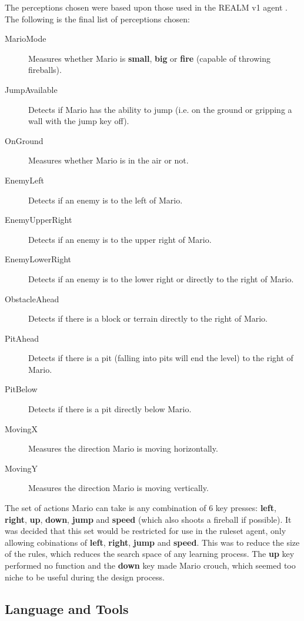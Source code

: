 The perceptions chosen were based upon those used in the REALM v1 agent \cite[p.~85]{realm}. The following is the final list of perceptions chosen:
\begin{description}
\item[MarioMode] Measures whether Mario is \textbf{small}, \textbf{big} or \textbf{fire} (capable of throwing fireballs).
\item[JumpAvailable] Detects if Mario has the ability to jump (i.e. on the ground or gripping a wall with the jump key off).
\item[OnGround] Measures whether Mario is in the air or not.
\item[EnemyLeft] Detects if an enemy is to the left of Mario.
\item[EnemyUpperRight] Detects if an enemy is to the upper right of Mario.
\item[EnemyLowerRight] Detects if an enemy is to the lower right or directly to the right of Mario.
\item[ObstacleAhead] Detects if there is a block or terrain directly to the right of Mario.
\item[PitAhead] Detects if there is a pit (falling into pits will end the level) to the right of Mario.
\item[PitBelow] Detects if there is a pit directly below Mario.
\item[MovingX] Measures the direction Mario is moving horizontally.
\item[MovingY] Measures the direction Mario is moving vertically.
\end{description}

The set of actions Mario can take is any combination of 6 key presses: \textbf{left}, \textbf{right}, \textbf{up}, \textbf{down}, \textbf{jump} and \textbf{speed} (which also shoots a fireball if possible). It was decided that this set would be restricted for use in the ruleset agent, only allowing cobinations of \textbf{left}, \textbf{right}, \textbf{jump} and \textbf{speed}. This was to reduce the size of the rules, which reduces the search space of any learning process. The \textbf{up} key performed no function and the \textbf{down} key made Mario crouch, which seemed too niche to be useful during the design process.



\subsection{Language and Tools}

